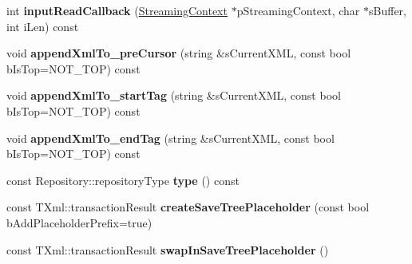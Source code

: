 \begin{DoxyCompactItemize}
\item 
\hypertarget{classgeneral__server_1_1Directory_a73298e4a7a052d4007198d2a13341613}{int {\bfseries input\-Read\-Callback} (\hyperlink{classgeneral__server_1_1Repository_1_1StreamingContext}{\-Streaming\-Context} $\ast$p\-Streaming\-Context, char $\ast$s\-Buffer, int i\-Len) const }\label{classgeneral__server_1_1Directory_a73298e4a7a052d4007198d2a13341613}

\item 
\hypertarget{classgeneral__server_1_1Directory_a26571918bb909e8397b7452416cd173e}{void {\bfseries append\-Xml\-To\-\_\-pre\-Cursor} (string \&s\-Current\-X\-M\-L, const bool b\-Is\-Top=\-N\-O\-T\-\_\-\-T\-O\-P) const }\label{classgeneral__server_1_1Directory_a26571918bb909e8397b7452416cd173e}

\item 
\hypertarget{classgeneral__server_1_1Directory_abe3671c1d0227a4432bdf7c4081f91db}{void {\bfseries append\-Xml\-To\-\_\-start\-Tag} (string \&s\-Current\-X\-M\-L, const bool b\-Is\-Top=\-N\-O\-T\-\_\-\-T\-O\-P) const }\label{classgeneral__server_1_1Directory_abe3671c1d0227a4432bdf7c4081f91db}

\item 
\hypertarget{classgeneral__server_1_1Directory_afb903c2e2dcd8716a86bf08ac8455be0}{void {\bfseries append\-Xml\-To\-\_\-end\-Tag} (string \&s\-Current\-X\-M\-L, const bool b\-Is\-Top=\-N\-O\-T\-\_\-\-T\-O\-P) const }\label{classgeneral__server_1_1Directory_afb903c2e2dcd8716a86bf08ac8455be0}

\item 
\hypertarget{classgeneral__server_1_1Directory_a9fa1ba5dff49d16f1b486d70b498bfd8}{const \-Repository\-::repository\-Type {\bfseries type} () const }\label{classgeneral__server_1_1Directory_a9fa1ba5dff49d16f1b486d70b498bfd8}

\item 
\hypertarget{classgeneral__server_1_1Directory_a19d3ae66bd7601fa097c115416b0b082}{const \-T\-Xml\-::transaction\-Result {\bfseries create\-Save\-Tree\-Placeholder} (const bool b\-Add\-Placeholder\-Prefix=true)}\label{classgeneral__server_1_1Directory_a19d3ae66bd7601fa097c115416b0b082}

\item 
\hypertarget{classgeneral__server_1_1Directory_a8dce25d2f8665cf1fd87be2d74907e1f}{const \-T\-Xml\-::transaction\-Result {\bfseries swap\-In\-Save\-Tree\-Placeholder} ()}\label{classgeneral__server_1_1Directory_a8dce25d2f8665cf1fd87be2d74907e1f}


\end{DoxyCompactItemize}
